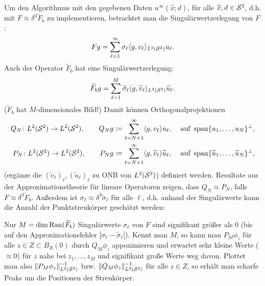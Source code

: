 Um den Algorithmus mit den gegebenen Daten \(u^\infty(\widehat{x};d)\), für alle \(\widehat{x},d\in\mathcal{S}^2\), d.h. mit \(F\approx\delta^3\widetilde{F}_b\) zu implementieren, betrachtet man die Singulärwertzerlegung von \(F\):
\begin{equation*}
	Fg=\sum_{\ell=1}^\infty\sigma_\ell\langle g, v_\ell\rangle_{L^2(\mathcal{S}^2)}u_\ell.
\end{equation*}
Auch der Operator \(\widetilde{F}_b\) hat eine Singulärwertzerlegung:
\begin{equation*}
	\widetilde{F}_bg=\sum_{\ell=1}^M\widetilde{\sigma}_\ell\langle g, \widetilde{v}_\ell\rangle_{L^2(\mathcal{S}^2)}\widetilde{u}_\ell.
\end{equation*}
(\(\widetilde{F}_b\) hat \(M\)-dimensionales Bild!) Damit können Orthogonalprojektionen
\begin{align*}
	Q_N\colon L^2(\mathcal{S}^2) \to L^2(\mathcal{S}^2),  \qquad  Q_Ng & \coloneqq\sum_{\ell=N+1}^\infty\langle g, v_\ell\rangle u_\ell, & \text{ auf }\operatorname{span}\{u_1,\ldots, u_N\}^\perp,\\
	P_N\colon L^2(\mathcal{S}^2) \to L^2(\mathcal{S}^2),  \qquad  P_Ng & \coloneqq\sum_{\ell=N+1}^\infty\langle g, \widetilde{v}_\ell\rangle\widetilde{u}_\ell, & \text{ auf }\operatorname{span}\{\widetilde{u}_1,\ldots, \widetilde{u}_N\}^\perp,
\end{align*}
(ergänze die \((\widetilde{v}_\ell)_\ell, (\widetilde{u}_\ell)_\ell\) zu ONB von \(L^2(\mathcal{S}^2)\)) definiert werden. Resultate aus der Approximationstheorie für lineare Operatoren zeigen, dass \(Q_N\approx P_N\), falls \(F\approx\delta^3\widetilde{F}_b\). Außerdem ist \(\sigma_\ell\approx\delta^3\widetilde{\sigma}_\ell\) für alle \(\ell\), d.h. anhand der Singulärwerte kann die Anzahl der Punktstreukörper geschätzt werden:\vspace{1.5mm}

Nur \(M=\dim\operatorname{Ran}(\widetilde{F}_b)\) Singulärwerte \(\sigma_\ell\) von \(F\) sind signifikant größer als \(0\) (bis auf den Approximationsfehler \(|\sigma_\ell-\widetilde{\sigma}_\ell|\)). Kennt man \(M\), so kann man \(P_M\phi_z\) für alle \(z\in Z\subset B_R(0)\) durch \(Q_M\phi_z\) appoximieren und erwartet sehr kleine Werte (\(\approx0\)) für \(z\) nahe bei \(z_1,\ldots,z_M\) und signifikant große Werte weg davon. Plottet man also \(\|P_M\phi_z\|_{L^2(\mathcal{S}^2)}^{-1}\) bzw. \(\|Q_M\phi_z\|_{L^2(\mathcal{S}^2)}^{-1}\) für alle \(z\in Z\), so erhält man scharfe Peaks um die Positionen der Streukörper.




















